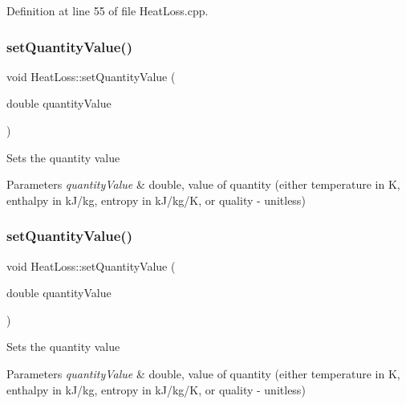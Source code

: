 Definition at line 55 of file Heat\+Loss.\+cpp.

\mbox{\label{class_heat_loss_ae6b6c4ac28471d7bc94e3886c48a90bd}} 
\subsubsection{\texorpdfstring{set\+Quantity\+Value()}{setQuantityValue()}\hspace{0.1cm}{\footnotesize\ttfamily [1/3]}}
{\footnotesize\ttfamily void Heat\+Loss\+::set\+Quantity\+Value (\begin{DoxyParamCaption}\item[{double}]{quantity\+Value }\end{DoxyParamCaption})}

Sets the quantity value 
\begin{DoxyParams}{Parameters}
{\em quantity\+Value} & double, value of quantity (either temperature in K, enthalpy in k\+J/kg, entropy in k\+J/kg/K, or quality -\/ unitless) \\
\hline
\end{DoxyParams}
\mbox{\label{class_heat_loss_ae6b6c4ac28471d7bc94e3886c48a90bd}} 
\subsubsection{\texorpdfstring{set\+Quantity\+Value()}{setQuantityValue()}\hspace{0.1cm}{\footnotesize\ttfamily [2/3]}}
{\footnotesize\ttfamily void Heat\+Loss\+::set\+Quantity\+Value (\begin{DoxyParamCaption}\item[{double}]{quantity\+Value }\end{DoxyParamCaption})}

Sets the quantity value 
\begin{DoxyParams}{Parameters}
{\em quantity\+Value} & double, value of quantity (either temperature in K, enthalpy in k\+J/kg, entropy in k\+J/kg/K, or quality -\/ unitless) \\
\hline
\end{DoxyParams}


